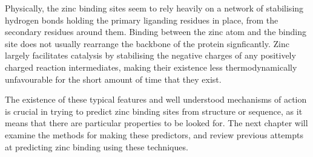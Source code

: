Physically, the zinc binding sites seem to rely heavily on a network of stabilising hydrogen bonds holding the primary liganding residues in place, from the secondary residues around them. Binding between the zinc atom and the binding site does not usually rearrange the backbone of the protein signficantly. Zinc largely facilitates catalysis by stabilising the negative charges of any positively charged reaction intermediates, making their existence less thermodynamically unfavourable for the short amount of time that they exist.

The existence of these typical features and well understood mechanisms of action is crucial in trying to predict zinc binding sites from structure or sequence, as it means that there are particular properties to be looked for. The next chapter will examine the methods for making these predictors, and review previous attempts at predicting zinc binding using these techniques.


